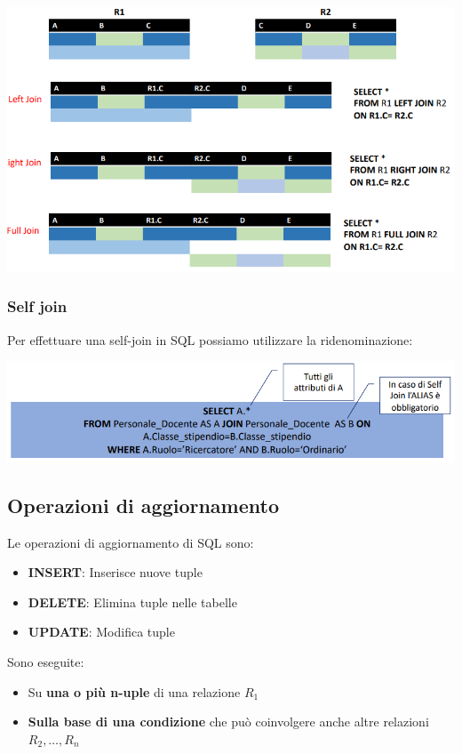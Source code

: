 \documentclass[12pt]{article}
\begin{document}
\begin{center}
    \includegraphics[width = 1.10\textwidth]{Images/202.PNG}
\end{center}
\subsubsection{Self join}
Per effettuare una self-join in SQL possiamo utilizzare la ridenominazione:
\begin{center}
    \includegraphics[width = 1\textwidth]{Images/203.PNG}
\end{center}
\subsection{Operazioni di aggiornamento}
Le operazioni di aggiornamento di SQL sono:
\begin{itemize}
    \item \textbf{INSERT}: Inserisce nuove tuple
    \item \textbf{DELETE}: Elimina tuple nelle tabelle
    \item \textbf{UPDATE}: Modifica tuple
\end{itemize}
Sono eseguite:
\begin{itemize}
    \item Su \textbf{una o più n-uple} di una relazione $R_1$
    \item \textbf{Sulla base di una condizione} che può coinvolgere anche altre relazioni $R_2, \dots, R_n$
\end{itemize}
\end{document}
